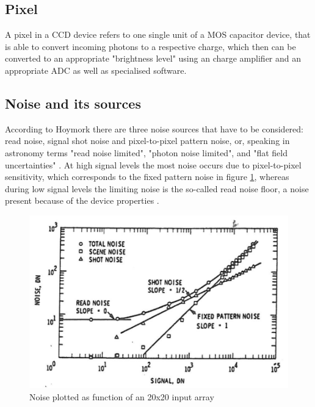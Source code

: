 
\subsection{Pixel}
A pixel in a CCD device refers to one single unit of a MOS capacitor device, that is able to convert incoming photons to a respective charge, which then can be converted to an appropriate "brightness level" using an charge amplifier and an appropriate ADC as well as specialised software.

\subsection{Noise and its sources}
\label{chap:noise}
According to Hoymork there are three noise sources that have to be considered: read noise, signal shot noise and pixel-to-pixel pattern noise, or, speaking in astronomy terms "read noise limited", "photon noise limited", and "flat field uncertainties" \citep{howellCCD,hoymorksensors}.
At high signal levels the most noise occurs due to pixel-to-pixel sensitivity, which corresponds to the fixed pattern noise in figure \ref{fig:noise}, whereas during low signal levels the limiting noise is the so-called read noise floor, a noise present because of the device properties \citep{hoymorksensors}.

\begin{figure}[!htbp]
	\centering
	\includegraphics[width=\linewidth]{images/noise}
		\caption{Noise plotted as function of an 20x20 input array \citep[c.f.][fig. 6.24]{hoymorksensors} }
		 \label{fig:noise}
\end{figure}

